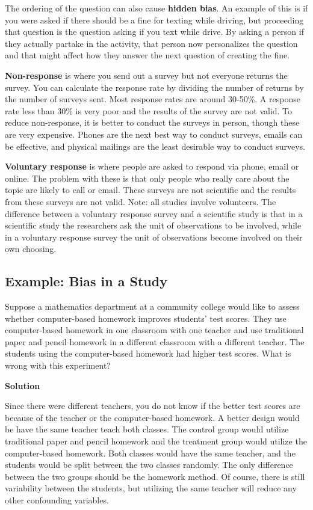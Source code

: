 \documentclass[]{book}
\begin{document}
The ordering of the question can also cause \textbf{hidden bias}. An example of this is if you were asked if there should be a fine for texting while driving, but proceeding that question is the question asking if you text while drive. By asking a person if they actually partake in the activity, that person now personalizes the question and that might affect how they answer the next question of creating the fine.

\textbf{Non-response} is where you send out a survey but not everyone returns the survey. You can calculate the response rate by dividing the number of returns by the number of surveys sent. Most response rates are around 30-50\%. A response rate less than 30\% is very poor and the results of the survey are not valid. To reduce non-response, it is better to conduct the surveys in person, though these are very expensive. Phones are the next best way to conduct surveys, emails can be effective, and physical mailings are the least desirable way to conduct surveys.

\textbf{Voluntary response} is where people are asked to respond via phone, email or online. The problem with these is that only people who really care about the topic are likely to call or email. These surveys are not scientific and the results from these surveys are not valid. Note: all studies involve volunteers. The difference between a voluntary response survey and a scientific study is that in a scientific study the researchers ask the unit of observations to be involved, while in a voluntary response survey the unit of observations become involved on their own choosing.

\hypertarget{example-bias-in-a-study}{%
\subsection{Example: Bias in a Study}\label{example-bias-in-a-study}}

Suppose a mathematics department at a community college would like to assess whether computer-based homework improves students' test scores. They use computer-based homework in one classroom with one teacher and use traditional paper and pencil homework in a different classroom with a different teacher. The students using the computer-based homework had higher test scores. What is wrong with this experiment?

\textbf{Solution}

Since there were different teachers, you do not know if the better test scores are because of the teacher or the computer-based homework. A better design would be have the same teacher teach both classes. The control group would utilize traditional paper and pencil homework and the treatment group would utilize the computer-based homework. Both classes would have the same teacher, and the students would be split between the two classes randomly. The only difference between the two groups should be the homework method. Of course, there is still variability between the students, but utilizing the same teacher will reduce any other confounding variables.
\end{document}
